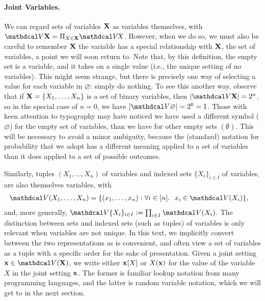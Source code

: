 \paragraph{Joint Variables.}
We can regard sets of variables $\mathbf X$ as variables themselves, with
$\V \mat X = \Pi_{X \in \mat X} \V\! X$.
However, when we do so, we must also be careful to remember $\mathbf X$ the variable has a special relationship with $\mathbf X$, the set of variables, a point we will soon return to. 
Note that, by this definition, the empty set is a variable, and it takes on a single value (i.e., the unique setting of no variables).  
This might seem strange, but there is precisely one way of selecting a value for each variable in $\varnothing$: simply do nothing. 
To see this another way, observe that if $\mathbf X = \{ X_1, \ldots, X_n \}$ is a set of binary variables,
then $|\V\mat X| = 2^n$, so in the special case of $n=0$, we have $|\V \varnothing | = 2^0 = 1$. 
Those with keen attention to typography may have noticed we have used a different symbol ($\varnothing$) for the empty set of variables, than we have for other empty sets $(\emptyset)$. 
This will be necessary to avoid a minor ambiguity, because the (standard) notation for probability that we adopt has a different meaning applied to a set of variables than it does applied to a set of possible outcomes. 

Similarly, tuples $(X_1, \ldots, X_n)$ of variables and indexed sets $\{X_i\}_{i \in I}$ of variables, are also themselves variables,
with
\begin{align*}
    \V(X_1, \ldots, X_n) &= \{ (x_1, \ldots, x_n) : \forall i \in [n].~~ x_i \in \V(X_i) \},
\end{align*}
and, more generally,
$
    \V\{ X_i \}_{i \in I} := \prod_{i \in I} \V(X_i).
$
The distinction between sets and indexed sets (such as tuples) of variables is only relevant when variables are not unique.
In this text, we implicitly convert between the two representations as is convenient, and often view a set of variables as a tuple with a specific order for the sake of presentation.
%
Given a joint setting $\mat x \in \V(\mat X)$, we write either $\mathbf x[X]$ or  $X(\mathbf x)$ for the value of the variable $X$ in the joint setting $\mathbf x$. The former is familiar lookup notation from many programming languages, and the latter is random variable notation, which we will get to in the next section.


